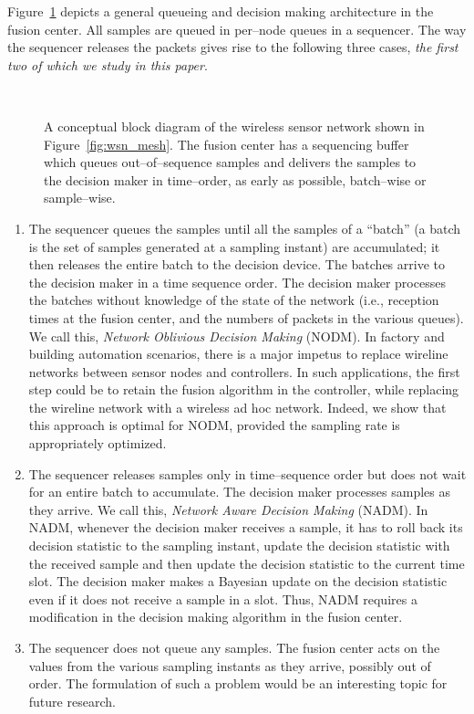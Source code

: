 \documentclass[acmtosn]{acmtrans2m}
\begin{document}
Figure~\ref{fig:system_arch} depicts a general queueing and decision
making architecture in the fusion center. All samples are queued in
per--node queues in a sequencer. The way the sequencer releases the 
packets gives rise to the following three cases, \emph{the first two
of which we study in this paper}.

\begin{figure}[t]
   \centering \
    \caption{A conceptual block diagram of the wireless sensor network
    shown in Figure~\ref{fig:wsn_mesh}. 
    The fusion center has a sequencing 
    buffer which queues out--of--sequence samples and delivers the samples 
    to the decision maker in time--order, as early as possible, batch--wise
    or sample--wise.}
   \label{fig:system_arch}
\end{figure}

\begin{enumerate}
\item The sequencer queues the samples until all the samples of a 
  ``batch'' (a batch is the set of samples generated at a 
  sampling instant) are accumulated; it then releases the entire batch to
  the decision device. The batches arrive to the decision 
  maker in a time sequence order. The decision maker processes
  the batches without knowledge of the state of the network (i.e., 
  reception times at the fusion center, and the numbers of 
  packets in the various queues). We call this, 
  {\em Network Oblivious Decision Making} ({\sf NODM}). In factory 
  and building automation scenarios, there is a major impetus to replace 
  wireline networks between sensor nodes and controllers. In such 
  applications, the first step could be to retain the fusion algorithm 
  in the controller, while replacing the wireline network with a 
  wireless ad hoc network. Indeed, we show that this approach is
  optimal for {\sf NODM}, provided the sampling rate is 
  appropriately optimized. 

\item The sequencer releases samples only in time--sequence order
  but does not wait for an entire batch to accumulate. The decision
  maker processes samples as they arrive. We call this, {\em 
  Network Aware Decision Making} ({\sf NADM}). In {\sf NADM},
  whenever the decision maker receives a sample, it has to roll back 
  its decision statistic to the sampling 
  instant, update the decision statistic with the received sample 
  and then update the decision statistic to the current time slot. 
  The decision maker makes a Bayesian update on the decision statistic 
  even if it does not receive a sample in a slot. Thus, {\sf NADM} 
  requires a modification in the decision making algorithm in the 
  fusion center. 
   

\item The sequencer does not queue any samples. The fusion center 
  acts on the values from the various sampling instants as they arrive, 
  possibly out of order. The formulation of such a problem would be 
  an interesting topic for future research. 
\end{enumerate}
\end{document}

